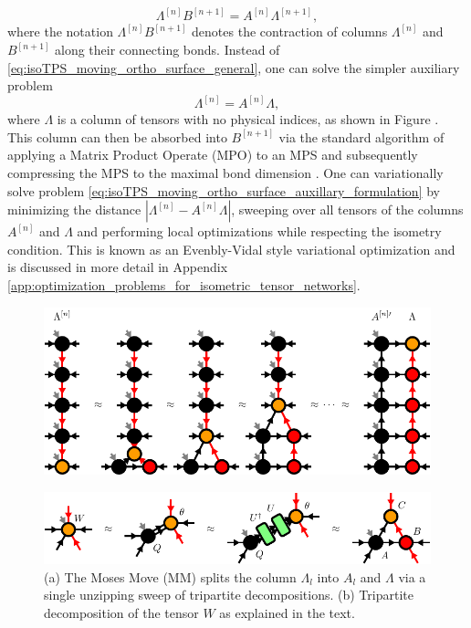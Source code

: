 \begin{equation}
	\label{eq:isoTPS_moving_ortho_surface_general}
	\Lambda^{[n]} B^{[n+1]} = A^{[n]} \Lambda^{[n+1]},
\end{equation}
where the notation $\Lambda^{[n]} B^{[n+1]}$ denotes the contraction of columns $\Lambda^{[n]}$ and $B^{[n+1]}$ along their connecting bonds. Instead of \eqref{eq:isoTPS_moving_ortho_surface_general}, one can solve the simpler auxiliary problem
\begin{equation}
	\label{eq:isoTPS_moving_ortho_surface_auxillary_formulation}
	\Lambda^{[n]} = A^{[n]} \Lambda,
\end{equation}
where $\Lambda$ is a column of tensors with no physical indices, as shown in Figure . This column can then be absorbed into $B^{[n+1]}$ via the standard algorithm of applying a Matrix Product Operate (MPO) to an MPS and subsequently compressing the MPS to the maximal bond dimension \cite{cite:DMRG_in_the_age_of_MPS}. One can variationally solve problem \eqref{eq:isoTPS_moving_ortho_surface_auxillary_formulation} by minimizing the distance $\left\lvert\Lambda^{[n]}-A^{[n]}\Lambda\right\rvert$, sweeping over all tensors of the columns $A^{[n]}$ and $\Lambda$ and performing local optimizations while respecting the isometry condition. This is known as an Evenbly-Vidal style variational optimization and is discussed in more detail in Appendix \ref{app:optimization_problems_for_isometric_tensor_networks}.
\begin{figure}
	\centering
	\subcaptionbox{\label{fig:Moses_move}}
	{%
		\includegraphics[scale=1]{figures/tikz/Tensor_Networks/isoTPS_MM/isoTPS_MM_a.pdf}
	}
	\par\medskip
	\subcaptionbox{\label{fig:tripartite_decomposition}}
	{%
		\includegraphics[scale=1]{figures/tikz/Tensor_Networks/isoTPS_MM/isoTPS_MM_b.pdf}
		
	}
	\caption{(a) The Moses Move (MM) splits the column $\Lambda_l$ into $A_l$ and $\Lambda$ via a single unzipping sweep of tripartite decompositions. (b) Tripartite decomposition of the tensor $W$ as explained in the text.}
	\label{fig:Moses_move_and_tripartite_decomposition}
\end{figure}
